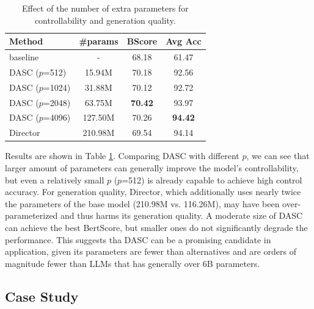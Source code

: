 \begin{table}[th]
    \small
    \centering
    \begin{tabular}{lccc}
    \hline
    Method      & \#params        & BScore         & Avg Acc        \\ \hline
    baseline    & -               & 68.18          & 61.47          \\
    DASC ($p$=512) & 15.94M          & 70.18          & 92.56          \\
    DASC ($p$=1024)& 31.88M          & 70.12          & 92.72          \\
    DASC ($p$=2048) & 63.75M          & \textbf{70.42} & 93.97          \\
    DASC ($p$=4096)& 127.50M         & 70.26          & \textbf{94.42} \\
    Director    & 210.98M         & 69.54          & 94.14          \\ \hline
    \end{tabular}
    \caption{Effect of the number of extra parameters for controllability and generation quality.}
    \label{tab:num_params}
\end{table}

Results are shown in Table \ref{tab:num_params}. Comparing DASC with different $p$, we can see that larger amount of parameters can generally improve the model's controllability, but even a relatively small $p$ ($p$=512) is already capable to achieve high control accuracy. For generation quality, Director, which additionally uses nearly twice the parameters of the base model (210.98M vs. 116.26M), may have been over-parameterized and thus harms its generation quality. A moderate size of DASC can achieve the best BertScore, but smaller ones do not significantly degrade the performance. This suggests tha DASC can be a promising candidate in application, given its parameters are fewer than alternatives and are orders of magnitude fewer than LLMs that has generally over 6B parameters.

\subsection{Case Study}

